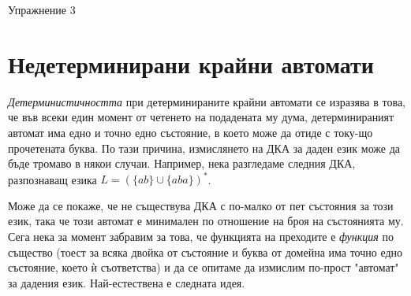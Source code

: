 \documentclass{article}
\begin{document}
\begin{center}
    {\huge Упражнение 3}
\end{center}

\vspace{15pt}

\section{Недетерминирани крайни автомати}
      \textit{Детерминистичността} при детерминираните крайни автомати се изразява в това,
      че във всеки един момент от четенето на подадената му дума, детерминираният
      автомат има едно и точно едно състояние, в което може да отиде с току-що прочетената
      буква. По тази причина, измислянето на ДКА за даден език може да бъде
      тромаво в някои случаи. Например, нека разгледаме следния ДКА, разпознаващ
      езика $L = (\{ab\} \cup \{aba\})^*$. 

      \begin{center}
    \end{center}

    Може да се покаже, че не съществува ДКА с по-малко от пет състояния за този език,
    така че този автомат е минимален по отношение на броя на състоянията му. Сега нека за момент забравим за това, че функцията
    на преходите е \textit{функция} по същество (тоест за всяка двойка от състояние и буква от домейна
    има точно едно състояние, което ѝ съответства) и да се опитаме да измислим по-прост
    "автомат" \hspace{0.01cm} за дадения език. Най-естествена е следната идея.
    \begin{center}
    \end{center}
\end{document}
